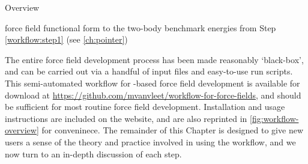 \begin{section}{Overview}
\begin{minipage}{\linewidth}
\begin{enumerate}[label=\Roman*)]
\begin{enumerate}[label=\arabic*)]
    force field functional form to the two-body benchmark energies from Step \ref{workflow:step1}
        (see \cref{ch:pointer})
    \end{enumerate}
\end{enumerate}
\phantom{abc}
\end{minipage}
%
The entire force field development
process has been made reasonably `black-box', and can be carried out via a
handful of input files and easy-to-use run scripts. This semi-automated workflow
for \sapt-based force field development is available for download 
at
\url{https://github.com/mvanvleet/workflow-for-force-fields}, and should be
sufficient for most routine force field development. Installation and
usage instructions are included on the website, and are also reprinted in
\cref{fig:workflow-overview} for conveninece. 
The remainder of this Chapter is designed to give new users a sense of the
theory and practice involved in using the workflow, and we now turn to an
in-depth discussion of each step.

\end{section}
